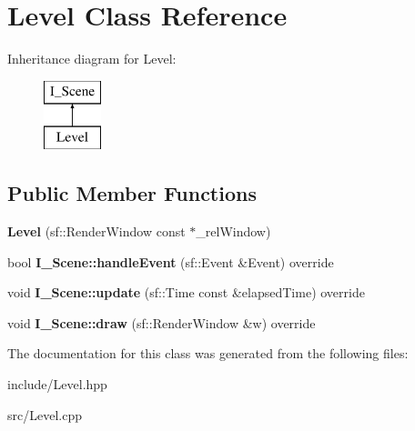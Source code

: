 \hypertarget{class_level}{}\section{Level Class Reference}
\label{class_level}
Inheritance diagram for Level\+:\begin{figure}[H]
\begin{center}
\leavevmode
\includegraphics[height=2.000000cm]{class_level}
\end{center}
\end{figure}
\subsection*{Public Member Functions}
\begin{DoxyCompactItemize}
\item 
\hypertarget{class_level_af6827a1d8fabc7499d053fdf85984d0f}{}{\bfseries Level} (sf\+::\+Render\+Window const $\ast$\+\_\+rel\+Window)\label{class_level_af6827a1d8fabc7499d053fdf85984d0f}

\item 
\hypertarget{class_level_ad5e0fc9d0ccf1929bd30dd86e6177253}{}bool {\bfseries I\+\_\+\+Scene\+::handle\+Event} (sf\+::\+Event \&Event) override\label{class_level_ad5e0fc9d0ccf1929bd30dd86e6177253}

\item 
\hypertarget{class_level_a0effca981113957b8c3ae05d1a333ce8}{}void {\bfseries I\+\_\+\+Scene\+::update} (sf\+::\+Time const \&elapsed\+Time) override\label{class_level_a0effca981113957b8c3ae05d1a333ce8}

\item 
\hypertarget{class_level_aa509bef4114cc07f7e119ea36a75a2d5}{}void {\bfseries I\+\_\+\+Scene\+::draw} (sf\+::\+Render\+Window \&w) override\label{class_level_aa509bef4114cc07f7e119ea36a75a2d5}

\end{DoxyCompactItemize}


The documentation for this class was generated from the following files\+:\begin{DoxyCompactItemize}
\item 
include/Level.\+hpp\item 
src/Level.\+cpp\end{DoxyCompactItemize}
